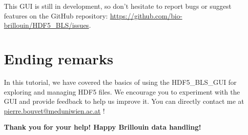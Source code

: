 \documentclass{article}
\begin{document}
This GUI is still in development, so don't hesitate to report bugs or suggest features on the GitHub repository: \url{https://github.com/bio-brillouin/HDF5_BLS/issues}.

\section{Ending remarks}

In this tutorial, we have covered the basics of using the HDF5\_BLS\_GUI for exploring and managing HDF5 files. We encourage you to experiment with the GUI and provide feedback to help us improve it. You can directly contact me at \href{mailto:pierre.bouvet@meduniwien.ac.at}{pierre.bouvet@meduniwien.ac.at} !

\vspace{5\baselineskip}

\begin{center}
\textbf{Thank you for your help! Happy Brillouin data handling!}
\end{center}
\end{document}
